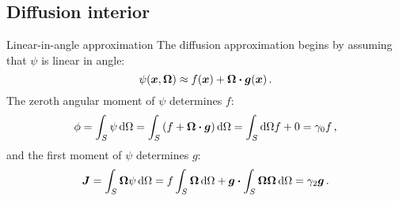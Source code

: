 \documentclass{beamer}
\begin{document}
\subsection{Diffusion interior}
\begin{frame}{Linear-in-angle approximation}
The diffusion approximation begins by assuming that $\psi$ is linear in angle:
\begin{equation*}
  \psi(\bm{x}, \bm{\Omega}) \approx f(\bm{x}) + \bm{\Omega} \bm{\cdot}
  \bm{g}(\bm{x})\,.
\end{equation*}
The zeroth angular moment of $\psi$ determines $f$:
\begin{equation*}
  \phi = \int_S \psi \mathop{}\!\mathrm{d}\Omega
= \int_S \left( f + \bm{\Omega}\bm{\cdot} \bm{g} \right) \mathop{}\!\mathrm{d}\Omega
= \int_S\mathop{}\!\mathrm{d}\Omega f + 0
= \gamma_0 f \,,
\end{equation*}
and the first moment of $\psi$ determines $g$:
\begin{equation*}
  \bm{J} = \int_S \bm{\Omega} \psi \mathop{}\!\mathrm{d}\Omega
= f \int_S \bm{\Omega} \mathop{}\!\mathrm{d}\Omega
  + \bm{g} \bm{\cdot} \int_S \bm{\Omega}\bm{\Omega} \mathop{}\!\mathrm{d}\Omega
= \gamma_2 \bm{g} \,.
\end{equation*}
%
%
%
\end{frame}
\end{document}
